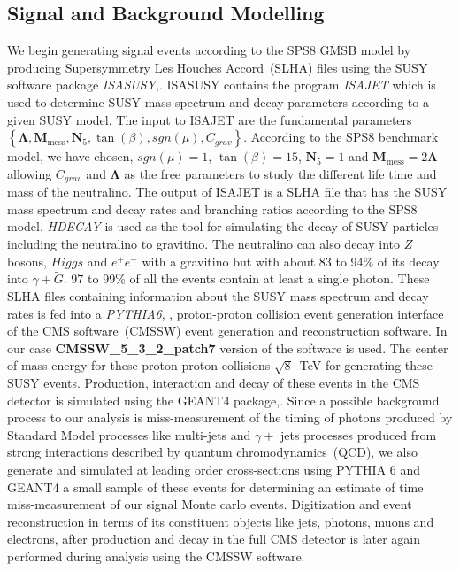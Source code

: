 \subsection{Signal and Background Modelling}
We begin generating signal events according to the SPS8 GMSB model by producing Supersymmetry Les Houches Accord~(SLHA) files using the SUSY software package \textit{ISASUSY},\cite{ISAJET}. ISASUSY contains the  program \textit{ISAJET} which is used to determine SUSY mass spectrum and decay parameters according to a given SUSY model.  The input to ISAJET are the fundamental parameters 
$ \left\{ \mathbf{\Lambda}, \mathbf{M}_{\mbox{mess}}, \mathbf{N}_{5}, \tan(\beta), sgn(\mu), C_{grav}\right\} $. According to the SPS8 benchmark model, we have chosen, $sgn(\mu)= 1$, $ \tan(\beta) = 15$, $  \mathbf{N}_{5} = 1 $ and $\mathbf{M}_{\mbox{mess}} = 2\mathbf{\Lambda}$ allowing $ C_{grav}$ and $  \mathbf{\Lambda} $ as the free parameters to study the different life time and mass of the neutralino. The output of ISAJET is a SLHA file that has the SUSY mass spectrum and decay rates and branching ratios according to the SPS8 model. \textit{HDECAY} is used as the tool for simulating the decay of SUSY particles including the neutralino to gravitino. The neutralino can also decay into $Z$ bosons, $Higgs$ and $e^{+}e^{-}$ with a gravitino but with about 83 to 94\% of its decay into $\gamma + \tilde{G}$. 97 to 99\% of all the events contain at least a single photon. 
These SLHA files containing information about the SUSY mass spectrum and decay rates is fed into a \textit{PYTHIA6}, \cite{PYTHIA6}, proton-proton collision event generation interface of the CMS software~(CMSSW) event generation and reconstruction software. In our case \textbf{CMSSW\_5\_3\_2\_patch7} version of the software is used. The center of mass energy for these proton-proton collisions $\sqrt{8}$~TeV for generating these SUSY events. Production, interaction and decay of these events in the CMS detector is simulated using the GEANT4 package,\cite{GEANT4}.
Since a possible background process to our analysis is miss-measurement of the timing of photons produced by Standard Model processes like  multi-jets and $\gamma +$ jets processes produced from strong interactions described by quantum chromodynamics~(QCD), we also  generate and simulated at leading order cross-sections using PYTHIA 6 and GEANT4  a small sample of these events for determining an estimate of time miss-measurement of our signal Monte carlo events.
Digitization and event reconstruction in terms of its constituent objects like jets, photons, muons and electrons, after production and decay in the full CMS detector is later again performed during analysis using the CMSSW software.
